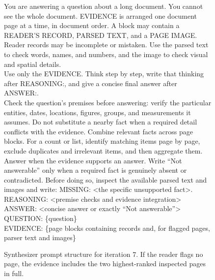 \begin{figure}[t]
\centering
\begin{tcolorbox}[
  colback=gray!5,colframe=gray!50,boxrule=0.4pt,
  fontupper=\small\ttfamily,left=6pt,right=6pt
]
You are answering a question about a long document. You cannot see the
whole document. EVIDENCE is arranged one document page at a time, in
document order. A block may contain a READER'S RECORD, PARSED TEXT, and a
PAGE IMAGE. Reader records may be incomplete or mistaken. Use the parsed
text to check words, names, and numbers, and the image to check visual
and spatial details.\\[0.5em]

Use only the EVIDENCE. Think step by step, write that thinking after
REASONING:, and give a concise final answer after ANSWER:.\\[0.5em]

Check the question's premises before answering: verify the particular
entities, dates, locations, figures, groups, and measurements it assumes.
Do not substitute a nearby fact when a required detail conflicts with
the evidence. Combine relevant facts across page blocks. For a count
or list, identify matching items page by page, exclude duplicates and
irrelevant items, and then aggregate them.\\[0.5em]

Answer when the evidence supports an answer. Write ``Not answerable''
only when a required fact is genuinely absent or contradicted. Before
doing so, inspect the available parsed text and images and write:
MISSING: <the specific unsupported fact>.\\[0.5em]

REASONING: <premise checks and evidence integration>\\
ANSWER: <concise answer or exactly ``Not answerable''>\\[0.5em]

QUESTION: \{question\}\\
EVIDENCE: \{page blocks containing records and, for flagged pages,
parser text and images\}
\end{tcolorbox}
\caption{Synthesizer prompt structure for iteration 7. If the reader flags no page, the evidence includes the two highest-ranked inspected pages in full.}
\label{fig:app_synthesizer_prompt}
\end{figure}